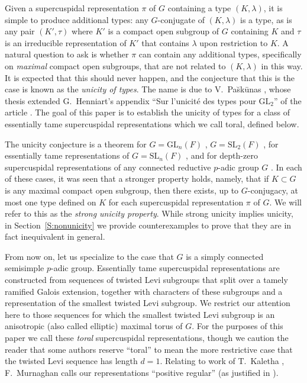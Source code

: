 \documentclass[12pt]{amsart}
\newcommand{\ratk}{F}
\newcommand{\SL}{\mathrm{SL}}
\newcommand{\GL}{\mathrm{GL}}
\theoremstyle{plain}
\theoremstyle{definition}
\theoremstyle{remark}
\numberwithin{equation}{section}
\numberwithin{figure}{section}
\begin{document}
Given a supercuspidal representation $\pi$ of $G$ containing a type $(K,\lambda)$, it is simple to
produce additional types: any $G$-conjugate of $(K,\lambda)$ is a type, as
is any pair $(K', \tau)$ where $K'$ is a compact open subgroup of $G$ containing $K$ and $\tau$ is
an irreducible representation of $K'$ that contains $\lambda$ upon restriction to $K$. A natural
question to ask is whether $\pi$ can contain any additional types, specifically on \emph{maximal} compact open subgroups, that are not related to $(K,\lambda)$ in this way.  It is expected that this should never happen, and the conjecture that
this is the case is known as the \emph{unicity of types}.  The name is due to V.~Pa\u{s}k\={u}nas \cite{Paskunas2005}, whose thesis extended G.~Henniart's appendix ``Sur l'unicit\'e des types pour $\GL_2$'' of the article \cite{BreuilMezard2002}.  The goal of this paper is to establish
the unicity of types for a class of essentially tame supercuspidal representations which we call toral, defined below.

The unicity conjecture is a theorem for $G=\GL_n(\ratk)$ \cite{Paskunas2005}, $G=\SL_2(\ratk)$ \cite{Latham2016}, for essentially tame representations of $G=\SL_n(\ratk)$ \cite{Latham2018}, and for depth-zero supercuspidal representations of any connected reductive $p$-adic group $G$ \cite{Latham2017}.  
In each of these cases, it was seen that a stronger property holds, namely,  that if $K\subset G$ is any maximal compact open subgroup,
then there exists, up to $G$-conjugacy, at most one type defined on $K$ for each supercuspidal
representation $\pi$ of $G$.  We will refer to this as the \emph{strong unicity property}.  While strong unicity implies unicity, in Section~\ref{S:nonunicity} we provide counterexamples to prove that they are in fact inequivalent in general.


From now on, let us specialize to the case that $G$ is a simply connected semisimple $p$-adic group.  Essentially tame supercuspidal representations are constructed from sequences of twisted Levi subgroups that split over a tamely ramified Galois extension, together with characters of these subgroups and a representation of the smallest twisted Levi subgroup.  We restrict our attention here to  those sequences for which the smallest twisted Levi subgroup is an anisotropic (also called elliptic) maximal torus of $G$.    
For the purposes of this paper we call these \emph{toral} supercuspidal representations, though we caution the reader that some authors reserve ``toral'' to mean the more restrictive case that the twisted Levi sequence has length $d=1$.  Relating to work of T.~Kaletha \cite{Kaletha},  F.~Murnaghan calls our representations ``positive regular'' (as justified in \cite{Murnaghan2017}).  
\end{document}

